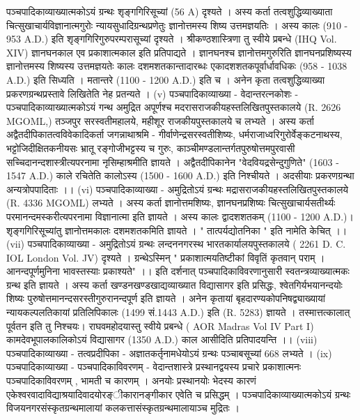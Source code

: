 पञ्चपादिकाव्याख्यात्मकोऽयं ग्रन्थः शृङ्गगिरिसूच्यां (56 A) दृश्यते । अस्य कर्ता तत्वशुद्धिव्याख्याता चित्सुखाचार्यविज्ञानात्मगुरोः न्यायसुधादिग्रन्थप्रणेतुः ज्ञानोत्तमस्य शिष्य उत्तमज्ञयतिः । अस्य कालः (910 - 953 A.D.) इति शृङ्गगिरिगुरुपरम्परासूच्यां दृश्यते । श्रीकण्ठशास्त्रिणा तु स्वीये प्रबन्धे (IHQ Vol. XIV) ज्ञानघनकाल एव प्रकाशात्मकाल इति प्रतिपाद्यते । ज्ञानघनश्च ज्ञानोत्तमगुरुरिति ज्ञानघनप्रशिष्यस्य ज्ञानोत्तमस्य शिष्यस्य उत्तमज्ञयतेः कालः दशमशतकान्तादारब्धः एकादशशतकपूर्वार्धावधिकः (958 - 1038 A.D.) इति सिध्यति । मतान्तरे (1100 - 1200 A.D.) इति च । अनेन कृता तत्वशुद्धिव्याख्या प्रकरणग्रन्थप्रस्तावे लिखितेति नेह प्रतन्यते । 
(v) पञ्चपादिकाव्याख्या - वेदान्तरत्नकोशः -
पञ्चपादिकाव्याख्यात्मकोऽयं गन्थ अमुद्रित अपूर्णश्च मदरासराजकीयहस्तलिखितपुस्तकालये (R. 2626 MGOML,) तञ्जपुर सरस्वतीमहालये, महीशूर राजकीयपुस्तकालये च लभ्यते । अस्य कर्ता अद्वैतदीपिकातत्वविवेकादिकर्ता जगन्नाथाश्रमि - गीर्वाणेन्द्रसरस्वतीशिष्यः, धर्मराजाध्वरिगुरोर्वेङ्कटनाथस्य, भट्टोजिदीक्षितकनीयसः भ्रातू रङ्गोजीभट्टस्य च गुरुः, काञ्चीमण्डलान्तर्गतपुरुषोत्तमपुरवासी सच्चिदानन्दशास्त्रीत्यपरनामा नृसिम्हाश्रमीति ज्ञायते । अद्वैतदीपिकानेन "वेदवियद्रसेन्दुगुणिते" (1603 - 1547 A.D.) काले रचितेति कालोऽस्य (1500 - 1600 A.D.) इति निश्चीयते । अदसीयाः प्रकरणग्रन्था अन्यत्रोपपादिताः ।। 
(vi) पञ्चपादिकाव्याख्या -
अमुद्रितोऽयं ग्रन्थः मद्रासराजकीयहस्तलिखितपुस्तकालये (R. 4336 MGOML) लभ्यते । अस्य कर्ता ज्ञानोत्तमशिष्यः, ज्ञानघनप्रशिष्यः चित्सुखाचार्यसतीर्थ्यः परमानन्दमस्करीत्यपरनामा विज्ञानात्मा इति ज्ञायते । अस्य कालः द्वादशशतकम् (1100 - 1200 A.D.)। शृङ्गगिरिसूच्यांतु ज्ञानोत्तमकालः दशमशतकमिति ज्ञायते । " तात्पर्यद्योतनिका " इति नामेति केचित् ।। 
(vii) पञ्चपादिकाव्याख्या -
अमुद्रितोऽयं ग्रन्थः लन्दननगरस्थ भारतकार्यालयपुस्तकालये ( 2261 D. C. IOL London Vol. JV) दृश्यते । ग्रन्थेऽस्मिन् " प्रकाशात्मयतिष्टीकां विवृतिं कृतवान् पराम् । आनन्दपूर्णमुनिना भावस्तस्याः प्रकाश्यते" ।। इति दर्शनात् पञ्चपादिकाविवरणानुसारी स्वतन्त्रव्याख्यात्मकः ग्रन्थ इति ज्ञायते । अस्य कर्ता खण्डनखण्डखाद्यव्याख्यात विद्यासागर इति प्रसिद्धः, श्वेतगिर्यभयानन्दयोः शिष्यः पुरुषोत्तमानन्दसरस्तीगुरुरानन्दपूर्ण इति ज्ञायते । अनेन कृतायां बृहदारण्यकोपनिषद्व्याख्यायां न्यायकल्पलतिकायां प्रतिलिपिकालः (1499 सं.1443 A.D.) इति (R. 5283) ज्ञायते । तस्मात्तत्कालात् पूर्वतन इति तु निश्चयः। राघवमहोदयास्तु स्वीये प्रबन्धे ( AOR Madras Vol IV Part I) कामदेवभूपालकालिकोऽयं विद्यासागर (1350 A.D.) काल आसीदिति प्रतिपादयन्ति ।।
(viii) पञ्चपादिकाव्याख्या - तत्वप्रदीपिका - 
अज्ञातकर्तृनामधेयोऽयं ग्रन्थः पञ्चाबसूच्यां 668 लभ्यते । 
(ix) पञ्चपादिकाव्याख्या - पञ्चपादिकाविवरणम् - 
वेदान्तशास्त्रे प्रस्थानद्वयस्य प्रचारे प्रकाशात्मनः पञ्चपादिकाविवरणम् , भामती च कारणम् । अनयोः प्रस्थानयोः भेदस्य कारणं एकेश्वरवादाविद्याश्रयादिवादयोरङ्ीकारानङ्गीकार एवेति च प्रसिद्धम् । पञ्चपादिकाव्याख्यात्मकोऽयं ग्रन्थः विजयनगरसंस्कृतग्रन्थमालायां कलकत्तासंस्कृतग्रन्थमालायाञ्च मुद्रितः ।
